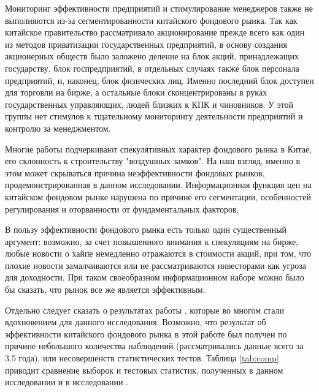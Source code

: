 \documentclass[a4paper,12pt]{article}
\begin{document}
Мониторинг эффективности предприятий и стимулирование менеджеров также не выполняются из-за сегментированности китайского фондового рынка. Так как китайское правительство рассматривало акционирование прежде всего как один из методов приватизации государственных предприятий, в основу создания акционерных обществ было заложено деление на блок акций, принадлежащих государству, блок госпредприятий, в отдельных случаях также блок персонала предприятий, и, наконец, блок физических лиц. Именно последний блок доступен для торговли на бирже, а остальные блоки сконцентрированы в руках государственных управляющих, людей близких к КПК и чиновников. У этой группы нет стимулов к тщательному мониторингу деятельности предприятий и контролю за менеджментом.

Многие работы подчеркивают спекулятивных характер фондового рынка в Китае, его склонность к строительству "воздушных замков". На наш взгляд, именно в этом может скрываться причина неэффективности фондовых рынков, продемонстрированная в данном исследовании. Информационная функция цен на китайском фондовом рынке нарушена по причине его сегментации, особенностей регулирования и оторванности от фундаментальных факторов.

В пользу эффективности фондового рынка есть только один существенный аргумент: возможно, за счет повышенного внимания к спекуляциям на бирже, любые новости о хайпе немедленно отражаются в стоимости акций, при том, что плохие новости замалчиваются или не рассматриваются инвесторами как угроза для доходности. При таком своеобразном информационном наборе можно было бы сказать, что рынок все же является эффективным.

Отдельно следует сказать о результатах работы \cite{Liu1997}, которые во многом стали вдохновением для данного исследования. Возможно, что результат об эффективности китайского фондового рынка в этой работе был получен по причине небольшого количества наблюдений (рассматривались данные всего за 3.5 года), или несовершенств статистических тестов. Таблица \ref{tab:comp} приводит сравнение выборок и тестовых статистик, полученных в данном исследовании и в исследовании \cite{Liu1997}.
\end{document}
